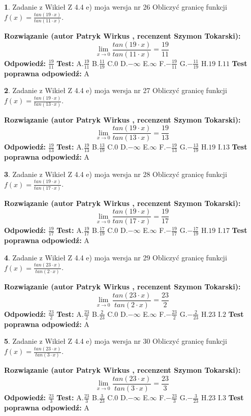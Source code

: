 \documentclass[12pt, a4paper]{article}
\theoremstyle{definition} %
\newtheorem{zad}{}
\newcommand{\zadStart}[1]{\begin{zad}#1\newline}
\newcommand{\zadStop}{\end{zad}}
\newcommand{\rozwStart}[2]{\noindent \textbf{Rozwiązanie (autor #1 , recenzent #2): }\newline}
\newcommand{\rozwStop}{\newline}
\newcommand{\odpStart}{\noindent \textbf{Odpowiedź:}\newline}
\newcommand{\odpStop}{\newline}
\newcommand{\testStart}{\noindent \textbf{Test:}\newline}
\newcommand{\testStop}{\newline}
\newcommand{\kluczStart}{\noindent \textbf{Test poprawna odpowiedź:}\newline}
\newcommand{\kluczStop}{\newline}
\begin{document}
\zadStart{Zadanie z Wikieł Z 4.4 e) moja wersja nr 26}
Obliczyć granicę funkcji $f(x)=\frac{tan(19\cdot x)}{tan(11\cdot x)}$.
\zadStop
\rozwStart{Patryk Wirkus}{Szymon Tokarski}
$$\lim\limits_{x\to 0}\frac{tan(19\cdot x)}{tan(11\cdot x)}=
\frac{19}{11}$$
\rozwStop
\odpStart
$\frac{19}{11}$
\odpStop
\testStart
A.$\frac{19}{11}$
B.$\frac{11}{19}$
C.$0$
D.$-\infty$
E.$\infty$
F.$-\frac{19}{11}$
G.$-\frac{11}{19}$
H.$19$
I.$11$
\testStop
\kluczStart
A
\kluczStop



\zadStart{Zadanie z Wikieł Z 4.4 e) moja wersja nr 27}
Obliczyć granicę funkcji $f(x)=\frac{tan(19\cdot x)}{tan(13\cdot x)}$.
\zadStop
\rozwStart{Patryk Wirkus}{Szymon Tokarski}
$$\lim\limits_{x\to 0}\frac{tan(19\cdot x)}{tan(13\cdot x)}=
\frac{19}{13}$$
\rozwStop
\odpStart
$\frac{19}{13}$
\odpStop
\testStart
A.$\frac{19}{13}$
B.$\frac{13}{19}$
C.$0$
D.$-\infty$
E.$\infty$
F.$-\frac{19}{13}$
G.$-\frac{13}{19}$
H.$19$
I.$13$
\testStop
\kluczStart
A
\kluczStop



\zadStart{Zadanie z Wikieł Z 4.4 e) moja wersja nr 28}
Obliczyć granicę funkcji $f(x)=\frac{tan(19\cdot x)}{tan(17\cdot x)}$.
\zadStop
\rozwStart{Patryk Wirkus}{Szymon Tokarski}
$$\lim\limits_{x\to 0}\frac{tan(19\cdot x)}{tan(17\cdot x)}=
\frac{19}{17}$$
\rozwStop
\odpStart
$\frac{19}{17}$
\odpStop
\testStart
A.$\frac{19}{17}$
B.$\frac{17}{19}$
C.$0$
D.$-\infty$
E.$\infty$
F.$-\frac{19}{17}$
G.$-\frac{17}{19}$
H.$19$
I.$17$
\testStop
\kluczStart
A
\kluczStop



\zadStart{Zadanie z Wikieł Z 4.4 e) moja wersja nr 29}
Obliczyć granicę funkcji $f(x)=\frac{tan(23\cdot x)}{tan(2\cdot x)}$.
\zadStop
\rozwStart{Patryk Wirkus}{Szymon Tokarski}
$$\lim\limits_{x\to 0}\frac{tan(23\cdot x)}{tan(2\cdot x)}=
\frac{23}{2}$$
\rozwStop
\odpStart
$\frac{23}{2}$
\odpStop
\testStart
A.$\frac{23}{2}$
B.$\frac{2}{23}$
C.$0$
D.$-\infty$
E.$\infty$
F.$-\frac{23}{2}$
G.$-\frac{2}{23}$
H.$23$
I.$2$
\testStop
\kluczStart
A
\kluczStop



\zadStart{Zadanie z Wikieł Z 4.4 e) moja wersja nr 30}
Obliczyć granicę funkcji $f(x)=\frac{tan(23\cdot x)}{tan(3\cdot x)}$.
\zadStop
\rozwStart{Patryk Wirkus}{Szymon Tokarski}
$$\lim\limits_{x\to 0}\frac{tan(23\cdot x)}{tan(3\cdot x)}=
\frac{23}{3}$$
\rozwStop
\odpStart
$\frac{23}{3}$
\odpStop
\testStart
A.$\frac{23}{3}$
B.$\frac{3}{23}$
C.$0$
D.$-\infty$
E.$\infty$
F.$-\frac{23}{3}$
G.$-\frac{3}{23}$
H.$23$
I.$3$
\testStop
\kluczStart
A
\kluczStop
\end{document}
